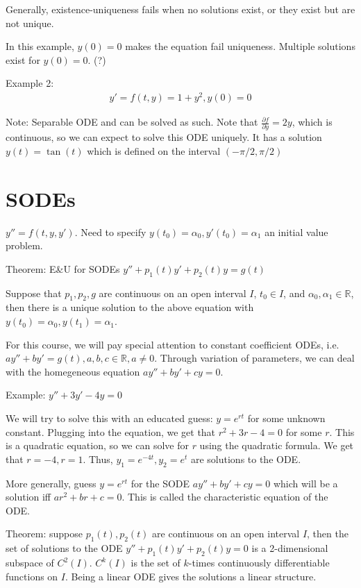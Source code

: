 \documentclass{article}
\newcommand{\R}{\mathbb{R}}
\begin{document}
Generally, existence-uniqueness fails when no solutions exist, or they exist but are not unique.

In this example, $y(0) =0$ makes the equation fail uniqueness. Multiple solutions exist for $y(0)=0$. (?)

Example 2:
\begin{gather}
y' = f(t,y) = 1 +y^2, y(0) = 0
\end{gather}

Note: Separable ODE and can be solved as such. Note that $\frac{\partial f}{\partial y} = 2y$, which is continuous, so we can expect to solve this ODE uniquely. It has a solution $y(t) = \tan(t)$ which is defined on the interval $(-\pi/2, \pi/2)$

\section{SODEs}

$y''=f(t,y,y')$. Need to specify $y(t_0) = \alpha_0, y'(t_0) = \alpha_1$ an initial value problem.

Theorem: E\&U for SODEs
$y'' + p_1(t)y' + p_2(t)y = g(t)$

Suppose that $p_1, p_2, g$ are continuous on an open interval $I$, $t_0 \in I$, and $\alpha_0, \alpha_1 \in \R$, then there is a unique solution to the above equation with $y(t_0)=\alpha_0, y(t_1)=\alpha_1$.

For this course, we will pay special attention to constant coefficient ODEs, i.e. $ay'' + by' = g(t), a,b,c \in \R, a\neq 0 $. Through variation of parameters, we can deal with the homegeneous equation $ay'' + by' + cy = 0$.

Example:
$y'' + 3y' - 4y = 0$

We will try to solve this with an educated guess: $y=e^{rt}$ for some unknown constant. Plugging into the equation, we get that $r^2 + 3r-4 = 0$ for some $r$. This is a quadratic equation, so we can solve for $r$ using the quadratic formula. We get that $r = -4, r=1$. Thus, $y_1 = e^{-4t}, y_2 = e^{t}$ are solutions to the ODE.

More generally, guess $y=e^{rt}$ for the SODE $ay'' + by' + cy=0$ which will be a solution iff $ar^2 + br + c =0$. This is called the characteristic equation of the ODE.

Theorem: suppose $p_1(t), p_2(t)$ are continuous on an open interval $I$, then the set of solutions to the ODE $y'' + p_1(t)y' + p_2(t)y = 0$ is a 2-dimensional subspace of $C^2(I)$. $C^k(I)$ is the set of $k$-times continuously differentiable functions on $I$. Being a linear ODE gives the solutions a linear structure. 
\end{document}
